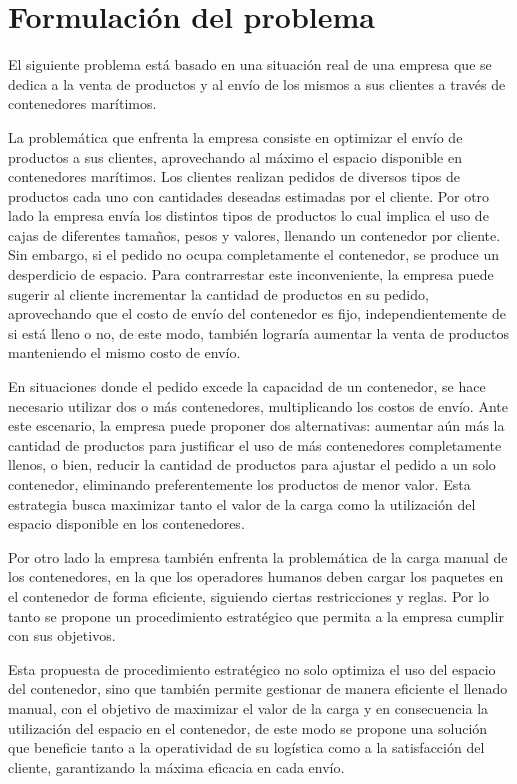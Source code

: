 \section{Formulación del problema}

El siguiente problema está basado en una situación real de una empresa que se dedica a la venta de productos y al envío de los mismos a sus clientes a través de contenedores marítimos.

La problemática que enfrenta la empresa consiste en optimizar el envío de productos a sus clientes, aprovechando al máximo el espacio disponible en contenedores marítimos. Los clientes realizan pedidos de diversos tipos de productos cada uno con cantidades deseadas estimadas por el cliente. Por otro lado la empresa envía los distintos tipos de productos lo cual implica el uso de cajas de diferentes tamaños, pesos y valores, llenando un contenedor por cliente. Sin embargo, si el pedido no ocupa completamente el contenedor, se produce un desperdicio de espacio. Para contrarrestar este inconveniente, la empresa puede sugerir al cliente incrementar la cantidad de productos en su pedido, aprovechando que el costo de envío del contenedor es fijo, independientemente de si está lleno o no, de este modo, también lograría aumentar la venta de productos manteniendo el mismo costo de envío.

En situaciones donde el pedido excede la capacidad de un contenedor, se hace necesario utilizar dos o más contenedores, multiplicando los costos de envío. Ante este escenario, la empresa puede proponer dos alternativas: aumentar aún más la cantidad de productos para justificar el uso de más contenedores completamente llenos, o bien, reducir la cantidad de productos para ajustar el pedido a un solo contenedor, eliminando preferentemente los productos de menor valor. Esta estrategia busca maximizar tanto el valor de la carga como la utilización del espacio disponible en los contenedores.

Por otro lado la empresa también enfrenta la problemática de la carga manual de los contenedores, en la que los operadores humanos deben cargar los paquetes en el contenedor de forma eficiente, siguiendo ciertas restricciones y reglas. Por lo tanto se propone un procedimiento estratégico que permita a la empresa cumplir con sus objetivos.

Esta propuesta de procedimiento estratégico no solo optimiza el uso del espacio del contenedor, sino que también permite gestionar de manera eficiente el llenado manual, con el objetivo de maximizar el valor de la carga y en consecuencia la utilización del espacio en el contenedor, de este modo se propone una solución que beneficie tanto a la operatividad de su logística como a la satisfacción del cliente, garantizando la máxima eficacia en cada envío.

